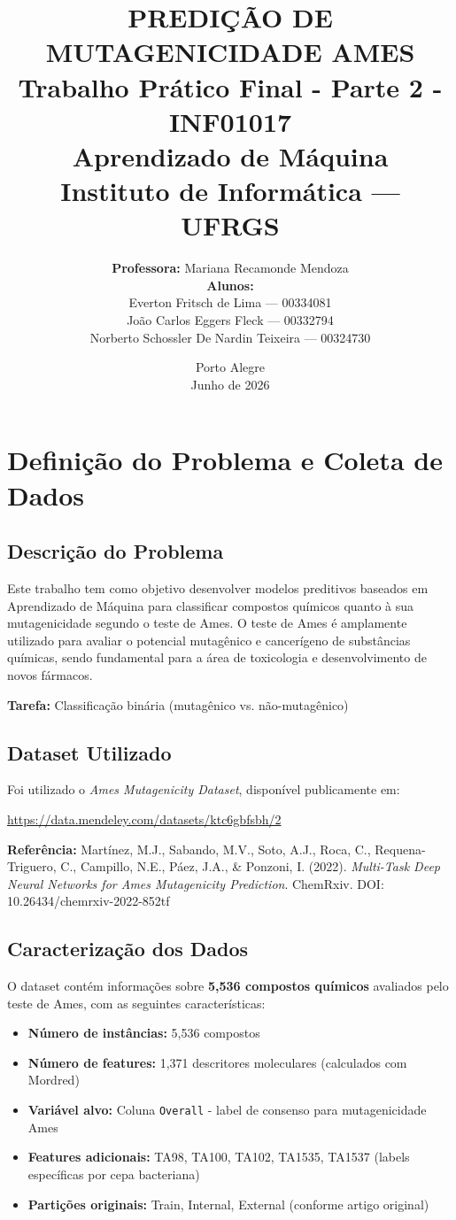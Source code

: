 \documentclass[12pt,a4paper]{article}
\title{
    \vspace{2cm}
    \Huge\textbf{\MakeUppercase{Predição de Mutagenicidade Ames}}\\[0.5cm]
    \Large Trabalho Prático Final - Parte 2 - INF01017\\[0.3cm]
    \large Aprendizado de Máquina\\[0.3cm]
    \large Instituto de Informática --- UFRGS\\[0.5cm]
    \vspace{2cm}
}
\author{
    \textbf{Professora:} Mariana Recamonde Mendoza\\[2em]
    \textbf{Alunos:}\\
    Everton Fritsch de Lima --- 00334081\\
    João Carlos Eggers Fleck --- 00332794\\
    Norberto Schossler De Nardin Teixeira --- 00324730\\
}
\date{
    \vfill
    Porto Alegre\\
    Junho de 2026
}
\begin{document}
\maketitle

\section{Definição do Problema e Coleta de Dados}

\subsection{Descrição do Problema}

Este trabalho tem como objetivo desenvolver modelos preditivos baseados em Aprendizado de Máquina para classificar compostos químicos quanto à sua mutagenicidade segundo o teste de Ames. O teste de Ames é amplamente utilizado para avaliar o potencial mutagênico e cancerígeno de substâncias químicas, sendo fundamental para a área de toxicologia e desenvolvimento de novos fármacos.

\textbf{Tarefa:} Classificação binária (mutagênico vs. não-mutagênico)

\subsection{Dataset Utilizado}

Foi utilizado o \textit{Ames Mutagenicity Dataset}, disponível publicamente em:

\url{https://data.mendeley.com/datasets/ktc6gbfsbh/2}

\textbf{Referência:} Martínez, M.J., Sabando, M.V., Soto, A.J., Roca, C., Requena-Triguero, C., Campillo, N.E., Páez, J.A., \& Ponzoni, I. (2022). \textit{Multi-Task Deep Neural Networks for Ames Mutagenicity Prediction}. ChemRxiv. DOI: 10.26434/chemrxiv-2022-852tf

\subsection{Caracterização dos Dados}

O dataset contém informações sobre \textbf{5,536 compostos químicos} avaliados pelo teste de Ames, com as seguintes características:

\begin{itemize}
    \item \textbf{Número de instâncias:} 5,536 compostos
    \item \textbf{Número de features:} 1,371 descritores moleculares (calculados com Mordred)
    \item \textbf{Variável alvo:} Coluna \texttt{Overall} - label de consenso para mutagenicidade Ames
    \item \textbf{Features adicionais:} TA98, TA100, TA102, TA1535, TA1537 (labels específicas por cepa bacteriana)
    \item \textbf{Partições originais:} Train, Internal, External (conforme artigo original)
\end{itemize}
\end{document}
